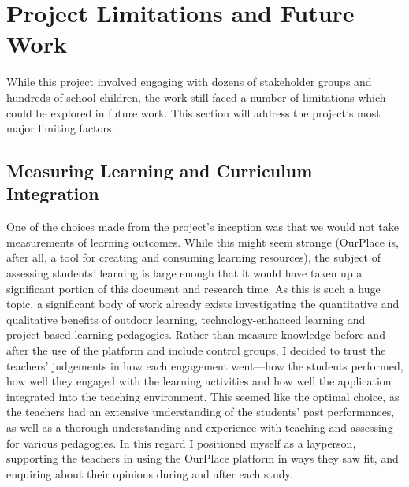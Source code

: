 \section{Project Limitations and Future Work}

While this project involved engaging with dozens of stakeholder groups and hundreds of school children, the work still faced a number of limitations which could be explored in future work. This section will address the project's most major limiting factors.

\subsection*{Measuring Learning and Curriculum Integration}
One of the choices made from the project's inception was that we would not take measurements of learning outcomes. While this might seem strange (OurPlace is, after all, a tool for creating and consuming learning resources), the subject of assessing students' learning is large enough that it would have taken up a significant portion of this document and research time. As this is such a huge topic, a significant body of work already exists investigating the quantitative and qualitative benefits of outdoor learning, technology-enhanced learning and project-based learning pedagogies. Rather than measure knowledge before and after the use of the platform and include control groups, I decided to trust the teachers' judgements in how each engagement went---how the students performed, how well they engaged with the learning activities and how well the application integrated into the teaching environment. This seemed like the optimal choice, as the teachers had an extensive understanding of the students' past performances, as well as a thorough understanding and experience with teaching and assessing for various pedagogies. In this regard I positioned myself as a layperson, supporting the teachers in using the OurPlace platform in ways they saw fit, and enquiring about their opinions during and after each study.

